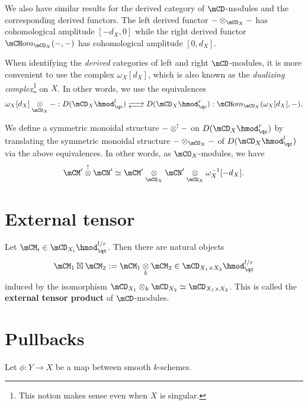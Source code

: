 	\begin{rem}
		We also have similar results for the derived category of $\mCD$-modules and the corresponding derived functors. The left derived functor $-\ot_{\mCO_X}-$ has cohomological amplitude $[-d_X,0]$ while the right derived functor $\mCH om_{\mCO_X}(-,-)$ has cohomological amplitude $[0,d_X]$.
	\end{rem}


	\begin{rem}
		When identifying the \emph{derived} categories of left and right $\mCD$-modules, it is more convenient to use the complex $\omega_X[d_X]$, which is also known as the \emph{dualizing complex}\footnote{This notion makes sense even when $X$ is singular.} on $X$. In other words, we use the equivalences
		\[
			\omega_X[d_X] \ot_{\mCO_X} - : D(\mCD_X\hmod_\qc^{l}) \adj D(\mCD_X\hmod_\qc^{r}) : \mCH om_{\mCO_X}(\omega_X[d_X],-).
		\]		
	\end{rem}


	\begin{constr}
		We define a symmetric monoidal structure $-\ot^! - $ on $D(\mCD_X\hmod_\qc^{r})$ by translating the symmetric monoidal structure $-\ot_{\mCO_X} - $ of $D(\mCD_X\hmod_\qc^{l})$ via the above equivalences. In other words, as $\mCO_X$-modules, we have
		\[
			\mCM' \ot^! \mCN' \simeq \mCM' \ot_{\mCO_X} \mCN' \ot_{\mCO_X} \omega_X^{-1}[-d_X].
		\]

	\end{constr}

\section{External tensor}
	\begin{constr}
		\label{constr-external}
		Let $\mCM_i \in \mCD_{X_i}\hmod_\qc^{l/r}$. Then there are natural objects
		\[
			\mCM_1 \boxt \mCM_2:=\mCM_1 \ot_{k} \mCM_2 \in \mCD_{X_1\mt X_2}\hmod_\qc^{l/r}
		\]
		induced by the isomorphism $\mCD_{X_1}\ot_k \mCD_{X_2} \simeq \mCD_{X_1\mt X_2}$. This is called the \textbf{external tensor product} of $\mCD$-modules.
		
	\end{constr}
	

\section{Pullbacks}

	Let $\phi: Y\to X$ be a map between smooth $k$-schemes.
	

